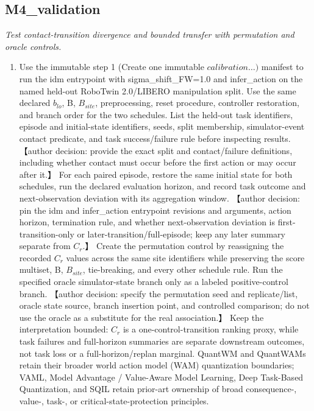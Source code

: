 \documentclass[10pt,a4paper]{article}
\begin{document}
\subsection*{M4\_validation}
\emph{Test contact-transition divergence and bounded transfer with permutation and oracle controls.}
\begin{enumerate}[leftmargin=*,start=5]
  \item Use the immutable step 1 (Create one immutable \(calibration\dots )\) manifest to run the idm entrypoint with sigma\_shift\_FW=1.0 and infer\_action on the named held-out RoboTwin 2.0/LIBERO manipulation split. Use the same declared \(b_{lo}\), B, \(B_{site}\), preprocessing, reset procedure, controller restoration, and branch order for the two schedules. List the held-out task identifiers, episode and initial-state identifiers, seeds, split membership, simulator-event contact predicate, and task success/failure rule before inspecting results. 【author decision: provide the exact split and contact/failure definitions, including whether contact must occur before the first action or may occur after it.】 For each paired episode, restore the same initial state for both schedules, run the declared evaluation horizon, and record task outcome and next-observation deviation with its aggregation window. 【author decision: pin the idm and infer\_action entrypoint revisions and arguments, action horizon, termination rule, and whether next-observation deviation is first-transition-only or later-transition/full-episode;\allowbreak{} keep any later summary separate from \(C_{r}\).】 Create the permutation control by reassigning the recorded \(C_{r}\) values across the same site identifiers while preserving the score multiset, B, \(B_{site}\), tie-breaking, and every other schedule rule. Run the specified oracle simulator-state branch only as a labeled positive-control branch. 【author decision: specify the permutation seed and replicate/list, oracle state source, branch insertion point, and controlled comparison;\allowbreak{} do not use the oracle as a substitute for the real association.】 Keep the interpretation bounded: \(C_{r}\) is a one-control-transition ranking proxy, while task failures and full-horizon summaries are separate downstream outcomes, not task loss or a full-horizon/replan marginal. QuantWM and QuantWAMs retain their broader world action model (WAM) quantization boundaries;\allowbreak{} VAML, Model Advantage / Value-Aware Model Learning, Deep Task-Based Quantization, and SQIL retain prior-art ownership of broad consequence-, value-, task-, or critical-state-protection principles.

\end{enumerate}
\end{document}
